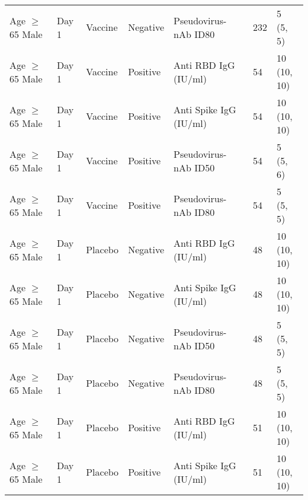 \documentclass[]{book}
\theoremstyle{definition}
\theoremstyle{definition}
\theoremstyle{definition}
\newcommand{\1}{\mathbbm{1}}
\begin{document}
\begin{landscape}
\begin{ThreePartTable}
\begin{longtable}[t]{>{\raggedright\arraybackslash}p{7cm}llllll}
\hspace{1em}Age $\geq$ 65 Male & Day 1 & Vaccine & Negative & Pseudovirus-nAb ID80 & 232 & \makecell[l]{5\\(5, 5)}\\
\hspace{1em}Age $\geq$ 65 Male & Day 1 & Vaccine & Positive & Anti RBD IgG (IU/ml) & 54 & \makecell[l]{10\\(10, 10)}\\
\hspace{1em}Age $\geq$ 65 Male & Day 1 & Vaccine & Positive & Anti Spike IgG (IU/ml) & 54 & \makecell[l]{10\\(10, 10)}\\
\hspace{1em}Age $\geq$ 65 Male & Day 1 & Vaccine & Positive & Pseudovirus-nAb ID50 & 54 & \makecell[l]{5\\(5, 6)}\\
\hspace{1em}Age $\geq$ 65 Male & Day 1 & Vaccine & Positive & Pseudovirus-nAb ID80 & 54 & \makecell[l]{5\\(5, 5)}\\
\hspace{1em}Age $\geq$ 65 Male & Day 1 & Placebo & Negative & Anti RBD IgG (IU/ml) & 48 & \makecell[l]{10\\(10, 10)}\\
\hspace{1em}Age $\geq$ 65 Male & Day 1 & Placebo & Negative & Anti Spike IgG (IU/ml) & 48 & \makecell[l]{10\\(10, 10)}\\
\hspace{1em}Age $\geq$ 65 Male & Day 1 & Placebo & Negative & Pseudovirus-nAb ID50 & 48 & \makecell[l]{5\\(5, 5)}\\
\hspace{1em}Age $\geq$ 65 Male & Day 1 & Placebo & Negative & Pseudovirus-nAb ID80 & 48 & \makecell[l]{5\\(5, 5)}\\
\hspace{1em}Age $\geq$ 65 Male & Day 1 & Placebo & Positive & Anti RBD IgG (IU/ml) & 51 & \makecell[l]{10\\(10, 10)}\\
\hspace{1em}Age $\geq$ 65 Male & Day 1 & Placebo & Positive & Anti Spike IgG (IU/ml) & 51 & \makecell[l]{10\\(10, 10)}\\

\end{longtable}
\end{ThreePartTable}
\end{landscape}
\end{document}
